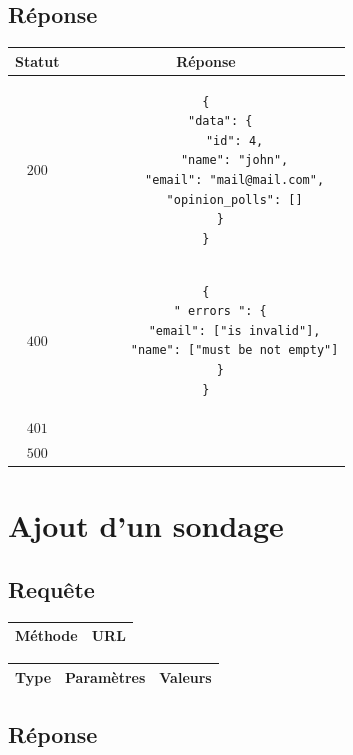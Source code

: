 \documentclass[titlepage]{report}
\begin{document}
\section{Réponse}

\begin{center}
	\begin{tabular}{|c|c|}
		\hline
		Statut & Réponse \\
		\hline
		$ 200 $ & \begin{lstlisting}
{
	"data": {
		"id": 4,
		"name": "john",
		"email": "mail@mail.com",
		"opinion_polls": []
	}
}
		\end{lstlisting} \\ 
		\hline
		$ 400 $ & \begin{lstlisting}
{
	" errors ": {
		"email": ["is invalid"],
		"name": ["must be not empty"]
	}
}
		\end{lstlisting} \\
		\hline
		$ 401 $ & \\
		\hline
		$ 500 $ & \\
		\hline
	\end{tabular}
\end{center}


\chapter{Ajout d'un sondage}

\section{Requête}

\begin{center}
	\begin{tabular}{|c|c|}
		\hline
		Méthode & URL \\
		\hline
		
	\end{tabular}
\end{center}


\begin{center}
	\begin{tabular}{|c|c|c|}
		\hline
		Type & Paramètres & Valeurs \\
		\hline
		
	\end{tabular}
\end{center}


\section{Réponse}
\end{document}
